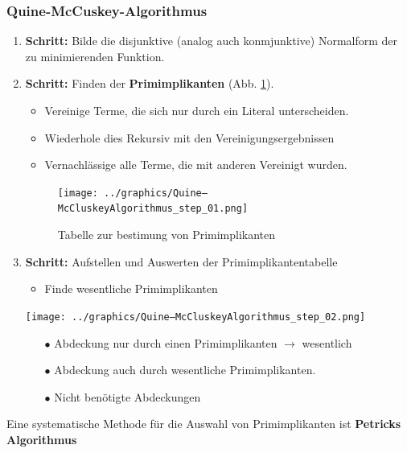 \documentclass[12pt]{report}
\begin{document}
\pagebreak
\subsubsection{Quine-McCuskey-Algorithmus}
\begin{enumerate}
  \item \textbf{Schritt:} Bilde die disjunktive (analog auch konmjunktive) Normalform der zu minimierenden Funktion.
  \item \textbf{Schritt:} Finden der \textbf{Primimplikanten} (Abb. \ref{fig:Quine–McCluskeyAlgorithmus_step_01}).
        \begin{itemize}
          \item Vereinige Terme, die sich nur durch ein Literal unterscheiden.
          \item Wiederhole dies Rekursiv mit den Vereinigungsergebnissen
          \item Vernachlässige alle Terme, die mit anderen Vereinigt wurden.
        \end{itemize}
        
        \begin{figure}[H]
          \caption{Tabelle zur bestimung von Primimplikanten}
          \label{fig:Quine–McCluskeyAlgorithmus_step_01}
          \centering
          \texttt{[image: ../graphics/Quine–McCluskeyAlgorithmus\_step\_01.png]}
        \end{figure}
        
  \item \textbf{Schritt:} Aufstellen und Auswerten der Primimplikantentabelle
        \begin{itemize}
          \item Finde wesentliche Primimplikanten
        \end{itemize}
        \begin{center}
          \texttt{[image: ../graphics/Quine–McCluskeyAlgorithmus\_step\_02.png]}
        \end{center}
        
        \begin{itemize}
          \item[\color{red} $\bullet$ ] Abdeckung nur durch einen Primimplikanten $\rightarrow$ wesentlich
          \item[\color{blue} $\bullet$ ] Abdeckung auch durch wesentliche Primimplikanten.
          \item[\color{gray} $\bullet$ ] Nicht benötigte Abdeckungen
        \end{itemize}
\end{enumerate}
Eine systematische Methode für die Auswahl von Primimplikanten ist \textbf{Petricks Algorithmus}
\end{document}
